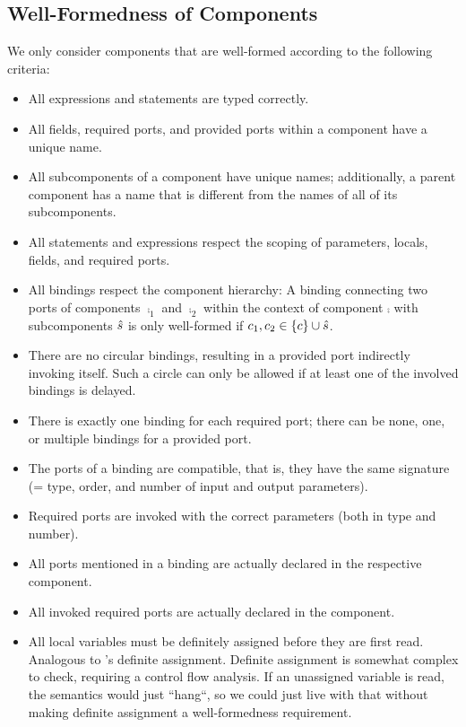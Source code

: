 \documentclass[a4paper,10pt,english]{article}
\begin{document}
\subsection{Well-Formedness of Components}
We only consider components that are well-formed according to the following criteria:
\begin{itemize}
	\item All expressions and statements are typed correctly.
	\item All fields, required ports, and provided ports within a component have a unique name.
	\item All subcomponents of a component have unique names; additionally, a parent component has a name that is different from the
	names of all of its subcomponents.
	\item All statements and expressions respect the scoping of parameters, locals, fields, and required ports.
	\item All bindings respect the component hierarchy: A binding connecting two ports of components $\comp_1$ and $\comp_2$ within
	the context of component $\comp$ with subcomponents $\hat{s}$ is only well-formed if $c_1, c_2 \in \{ c \} \cup
	\hat{s}$.
	\item There are no circular bindings, resulting in a provided port indirectly invoking itself. Such a circle can only be allowed
	if at least one of the involved bindings is delayed.
	\item There is exactly one binding for each required port; there can be none, one, or multiple bindings for a provided port.
	\item The ports of a binding are compatible, that is, they have the same signature (= type, order, and number of input and
	output parameters).
	\item Required ports are invoked with the correct parameters (both in type and number).
	\item All ports mentioned in a binding are actually declared in the respective component.
	\item All invoked required ports are actually declared in the component.
	\item All local variables must be definitely assigned before they are first read. Analogous to \CSharp's definite assignment.
	Definite assignment is somewhat complex to check, requiring a control flow analysis. If an unassigned variable is read, the
	semantics would just ``hang``, so we could just live with that without making definite assignment a well-formedness requirement.

\end{itemize}
\end{document}
